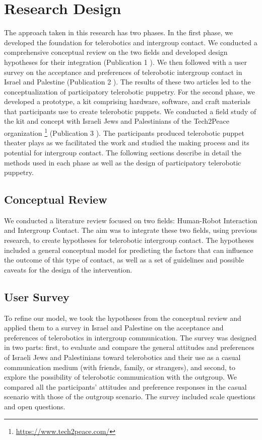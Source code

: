 \documentclass[dissertation,math,vertlayout,pdfa,colorlinks]{aaltoseries}
\begin{document}

\chapter{Research Design}
The approach taken in this research has two phases. In the first phase, we developed the foundation for telerobotics and intergroup contact. We conducted a comprehensive conceptual review on the two fields and developed design hypotheses for their integration (Publication 1 \cite{peledTelerobotContactHypothesis2022}). We then followed with a user survey on the acceptance and preferences of telerobotic intergroup contact in Israel and Palestine (Publication 2 \cite{peledTeleroboticIntergroupContact2024}). The results of these two articles led to the conceptualization of participatory telerobotic puppetry. For the second phase, we developed a prototype, a kit comprising hardware, software, and craft materials that participants use to create telerobotic puppets. We conducted a field study of the kit and concept with Israeli Jews and Palestinians of the Tech2Peace organization \footnote{\url{https://www.tech2peace.com/}} (Publication 3 \cite{peledTeleroboticTheaterOppressed2025}). The participants produced telerobotic puppet theater plays as we facilitated the work and studied the making process and its potential for intergroup contact. The following sections describe in detail the methods used in each phase as well as the design of participatory telerobotic puppetry.

\section{Conceptual Review}
We conducted a literature review focused on two fields: Human-Robot Interaction and Intergroup Contact. The aim was to integrate these two fields, using previous research, to create hypotheses for telerobotic intergroup contact. The hypotheses included a general conceptual model for predicting the factors that can influence the outcome of this type of contact, as well as a set of guidelines and possible caveats for the design of the intervention.
\section{User Survey}
To refine our model, we took the hypotheses from the conceptual review and applied them to a survey in Israel and Palestine on the acceptance and preferences of telerobotics in intergroup communication. The survey was designed in two parts: first, to evaluate and compare the general attitudes and preferences of Israeli Jews and Palestinians toward telerobotics and their use as a casual communication medium (with friends, family, or strangers), and second, to explore the possibility of telerobotic communication with the outgroup. We compared all the participants' attitudes and preference responses in the casual scenario with those of the outgroup scenario. The survey included scale questions and open questions.
\end{document}
